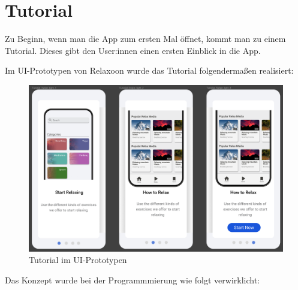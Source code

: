 \section{Tutorial}

Zu Beginn, wenn man die App zum ersten Mal öffnet, kommt man zu einem Tutorial. Dieses gibt den User:innen einen ersten
Einblick in die App.

Im UI-Prototypen von Relaxoon wurde das Tutorial folgendermaßen realisiert:

\begin{figure}[H]
    \centering
    \includegraphics[height=0.65\textwidth]{./pics/pTutorial.png}
    \caption{Tutorial im UI-Prototypen}
\end{figure}

\newpage

Das Konzept wurde bei der Programmmierung wie folgt verwirklicht:

